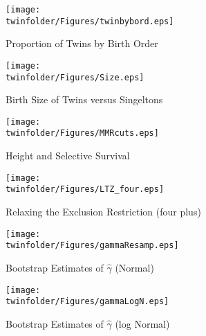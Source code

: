 \setcounter{figure}{0}
\renewcommand{\thefigure}{A\arabic{figure}}

\begin{figure}[htpb!]
\begin{center}
\caption{Proportion of Twins by Birth Order}
\label{TWINfig:bord}
\texttt{[image: \\twinfolder/Figures/twinbybord.eps]} 
\end{center}
\end{figure}

\begin{figure}[htpb!]
\begin{center}
\caption{Birth Size of Twins versus Singeltons}
\label{TWINfig:Size}
\texttt{[image: \\twinfolder/Figures/Size.eps]} 
\end{center}
\end{figure}

\begin{figure}[htpb!]
\begin{center}
\caption{Height and Selective Survival}
\label{TWINfig:survival}
\texttt{[image: \\twinfolder/Figures/MMRcuts.eps]} 
\end{center}
\end{figure}

\begin{figure}[htpb!]
\begin{center}
\caption{Relaxing the Exclusion Restriction (four plus)}
\label{TWINfig:ltz4}
\texttt{[image: \\twinfolder/Figures/LTZ\_four.eps]} 
\end{center}
\end{figure}

\begin{subfigures}
\begin{center}
\begin{figure}
\caption{Bootstrap Estimates of $\hat\gamma$ (Normal)}
\label{TWINfig:gammaBootsN}
\texttt{[image: \\twinfolder/Figures/gammaResamp.eps]} 
\end{figure}

\begin{figure}
\caption{Bootstrap Estimates of $\hat\gamma$ (log Normal)}
\label{TWINfig:gammaBootsL}
\texttt{[image: \\twinfolder/Figures/gammaLogN.eps]} 
\end{figure}
\end{center}
\end{subfigures}
